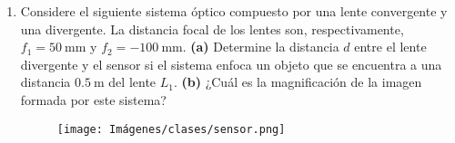 \documentclass[letterpaper,11pt]{article}
\begin{document}
\begin{enumerate}
\item Considere el siguiente sistema óptico compuesto por una lente convergente y una divergente. La distancia focal de los lentes son, respectivamente, $f_1=\SI{50}{\mm}$ y $f_2 = \SI{-100}{\mm}$. \textbf{(a)} Determine la distancia $d$ entre el lente divergente y el sensor si el sistema enfoca un objeto que se encuentra a una distancia $\SI{0.5}{\m}$ del lente $L_1$. \textbf{(b)} ¿Cuál es la magnificación de la imagen formada por este sistema?

\begin{figure}[H]
    \centering
    \texttt{[image: Imágenes/clases/sensor.png]}
\end{figure}

\end{enumerate}
\end{document}
